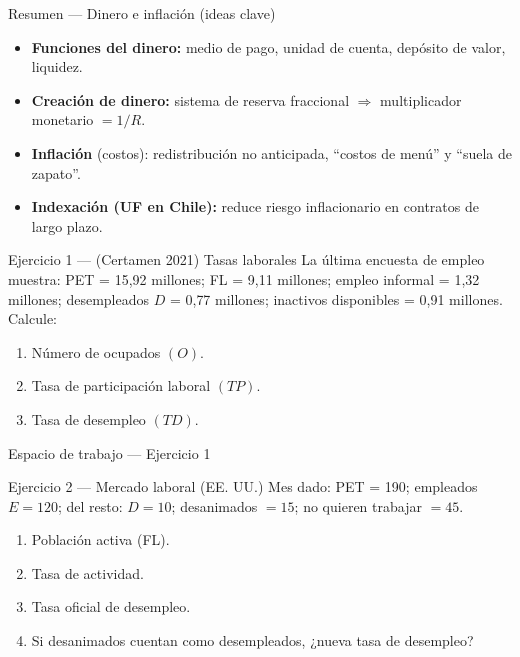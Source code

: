 \documentclass[aspectratio=169,10pt]{beamer}
\newcommand{\espacio}{\vfill\vfill}
\begin{document}
\begin{frame}{Resumen — Dinero e inflación (ideas clave)}
\begin{itemize}
  \item \textbf{Funciones del dinero:} medio de pago, unidad de cuenta, depósito de valor, liquidez.
  \item \textbf{Creación de dinero:} sistema de reserva fraccional $\Rightarrow$ multiplicador monetario $=1/R$.
  \item \textbf{Inflación} (costos): redistribución no anticipada, “costos de menú” y “suela de zapato”.
  \item \textbf{Indexación (UF en Chile):} reduce riesgo inflacionario en contratos de largo plazo.
\end{itemize}
\end{frame}


\begin{frame}{Ejercicio 1 — (Certamen 2021) Tasas laborales}
\small
La última encuesta de empleo muestra: PET = 15{,}92 millones; FL = 9{,}11 millones; empleo informal = 1{,}32 millones; desempleados $D$ = 0{,}77 millones; inactivos disponibles = 0{,}91 millones. Calcule:
\begin{enumerate}\itemsep4pt
  \item Número de ocupados $(O)$.
  \item Tasa de participación laboral $(TP)$.
  \item Tasa de desempleo $(TD)$.
\end{enumerate}
\end{frame}

\begin{frame}{Espacio de trabajo — Ejercicio 1}
\espacio
\end{frame}

\begin{frame}{Ejercicio 2 — Mercado laboral (EE. UU.)}
\small
Mes dado: PET = 190; empleados $E=120$; del resto: $D=10$; desanimados $=15$; no quieren trabajar $=45$.
\begin{enumerate}\itemsep4pt
  \item Población activa (FL).
  \item Tasa de actividad.
  \item Tasa oficial de desempleo.
  \item Si desanimados cuentan como desempleados, ¿nueva tasa de desempleo?
\end{enumerate}
\end{frame}
\end{document}
